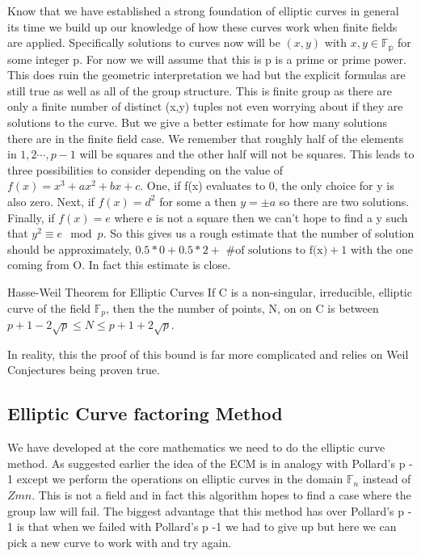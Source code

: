 \documentclass{article}
\begin{document}
Know that we have established a strong foundation of elliptic curves in general its time we build up our knowledge of how these curves work when finite fields are applied. Specifically solutions to curves now will be $(x,y)$ with $x, y \in \mathbb{F_p}$ for some integer p. For now we will assume that this is p is a prime or prime power.  This does ruin the geometric interpretation we had but the explicit formulas are still true as well as all of the group structure.  This is finite group as there are only a finite number of  distinct (x,y) tuples not even worrying about if they are solutions to the curve. 
But we give a better estimate for how many solutions there are in the finite field case. We remember that roughly half of the elements in $1, 2 \cdots , p - 1$ will be squares and the other half will not be squares. This leads to three possibilities to consider depending on the value of $f(x) = x^3 + ax^2 + bx  +c $. One, if f(x) evaluates to 0, the only choice for y is also zero. Next, if $f(x) = d^2$ for some a then $y = \pm a$ so there are two solutions. Finally, if $f(x) = e$ where e is not a square then we can't hope to find a y such that $y^2 \equiv  e \mod p$. So this gives us a rough estimate that the number of solution should be approximately, $0.5 * 0 + 0.5 * 2 + \text{ \# of solutions to f(x)} + 1$ with the one coming from O. In fact this estimate is close.
\begin{theorem}{Hasse-Weil Theorem for Elliptic Curves}
    If C is a non-singular, irreducible, elliptic curve of the field $\mathbb{F}_p$, then the the number of points, N, on on C is between $p + 1 - 2 \sqrt{p} \leq N \leq p + 1 + 2 \sqrt{p}$. 
\end{theorem}
In reality, this the proof of this bound is far more complicated and relies on Weil Conjectures being proven true.
\subsection{Elliptic Curve factoring Method}

We have developed at the core mathematics we need to do the elliptic curve method. As suggested earlier the idea of the ECM is in analogy with Pollard's p - 1 except we perform the operations on elliptic curves in the domain $\mathbb{F}_n$ instead of $Zm{n}$. This is not a field and in fact this algorithm hopes to find a case where the group law will fail. The biggest advantage that this method has over Pollard's p - 1 is that when we failed with Pollard's p -1 we had to give up but here we can pick a new curve to work with and try again. 
\end{document}
